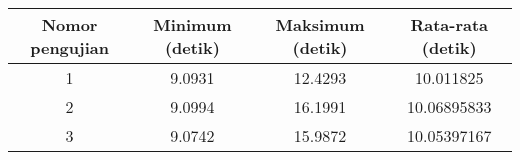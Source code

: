 \begin{tabular}{| c | c | c | c |}
    \hline
    Nomor pengujian & Minimum (detik) & Maksimum (detik) & Rata-rata (detik) \\
    \hline
    \hline
    1 & 9.0931 & 12.4293 & 10.011825 \\
    \hline
    2 & 9.0994 & 16.1991 & 10.06895833 \\
    \hline
    3 & 9.0742 & 15.9872 & 10.05397167 \\
    \hline
\end{tabular}